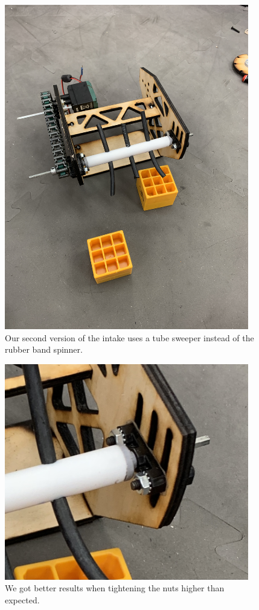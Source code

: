 \begin{figure}[ht]
\begin{minipage}[b]{.48\textwidth}
  \includegraphics[width=0.95\textwidth]{Meetings/August/08-26-21/8-26-21_Hardware_Image2 - Nathan Forrer.JPG}
  \caption{Our second version of the intake uses a tube sweeper instead of the rubber band spinner.}
  \label{fig:pic2}
\end{minipage}
\end{figure}

\begin{figure}[htp]
\centering
\includegraphics[width=0.95\textwidth]{Meetings/August/08-26-21/8-26-21_Hardware_Image3 - Nathan Forrer.JPG}
\caption{We got better results when tightening the nuts higher than expected.}
\label{fig:pic3}
\end{figure}